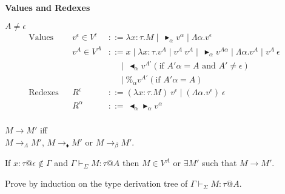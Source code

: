 \documentclass[9pt, a4paper]{extarticle}
\theoremstyle{break}
\newcommand{\figheader}[2]{
  \begin{flushleft}
    #2 {\bf \normalsize #1}
\end{flushleft}}
\newcommand{\G}{\Gamma}
\newcommand{\V}{\vdash_\Sigma}
\newcommand{\TB}{\blacktriangleright}
\newcommand{\TBL}{\blacktriangleleft}
\begin{document}
\figheader{Values and Redexes}{}
$A \neq \epsilon$\\
\begin{align*}
	\textrm{Values}                           &   & v^\epsilon \in V^\epsilon & ::= \lambda x:\tau.M \mid\ \TB_\alpha v^\alpha \mid \Lambda\alpha.v^\epsilon              & \\
	                                          &   & v^A \in V^A               & ::= x \mid \lambda x:\tau.v^A \mid v^A\ v^A \mid\ \TB_\alpha v^{A\alpha}
	\mid \Lambda\alpha.v^A \mid v^A\ \epsilon &                                                                                                                             \\
	                                          &   &                           & \quad\   \mid\ \TBL_\alpha v^{A'} (\text{if } A'\alpha = A \text{ and } A' \neq \epsilon) & \\
	                                          &   &                           & \quad\   \mid \%_\alpha v^{A'} (\text{if } A'\alpha = A)                                  & \\
	\textrm{Redexes}                          &   & R^\epsilon                & ::= (\lambda x:\tau.M)\ v^\epsilon \mid (\Lambda\alpha.v^\epsilon)\ \epsilon              & \\
	                                          &   & R^\alpha                  & ::=\ \TBL_\alpha \TB_\alpha v^\alpha                                                      & \\
\end{align*}

\begin{dfn}[Reduction]
	$ M \longrightarrow M'$ iff \\
	$ M \longrightarrow_\Lambda M' $, $ M \longrightarrow_\blacklozenge M' $ or $ M \longrightarrow_\beta M' $.
\end{dfn}

\begin{thm}[Progress]
	If $x:\tau@\epsilon \notin \G$ and $\G \V M : \tau @ A$ then $ M \in V^A $ or $\exists M'$ such that $M \longrightarrow M'$.
\end{thm}

Prove by induction on the type derivation tree of $\G \V M:\tau@A$.
\end{document}
